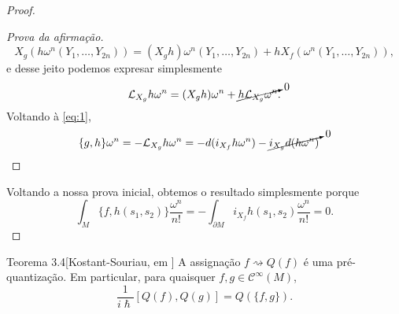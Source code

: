 \begin{proof}
\begin{proof}[Prova da afirmação]
\[X_g\left( h \omega^n\left( Y_1,\ldots,Y_{2n} \right)  \right)=(X_gh)\omega^n(Y_1,\ldots,Y_{2n})+hX_f\left( \omega^n(Y_1,\ldots,Y_{2n}) \right), \]
e desse jeito podemos expresar simplesmente
\[\mathcal{L}_{X_g}h\omega^n=(X_gh)\omega^n+\cancelto{0}{h\mathcal{L}_{X_g}\omega^n}.\]
Voltando à \cref{eq:1},
\begin{align*}
\{g,h\}\omega^n&=-\mathcal{L}_{X_g}h \omega^n=-d(i_{X_f}h\omega^n)-\cancelto{0}{i_{X_g}d(h \omega^n)}
\end{align*}
\end{proof}
Voltando a nossa prova inicial, obtemos o resultado simplesmente porque
\[\int_{M}\{f,h(s_1,s_2)\}\frac{\omega^n}{n!}=-\int_{\partial M}i_{X_f}h(s_1,s_2)\frac{\omega^n}{n!}=0.\]
\end{proof}

\begin{thing5}{Teorema 3.4}[Kostant-Souriau, em \cite{wang}]\leavevmode
A assignação $f \rightsquigarrow Q(f)$ é uma pré-quantização. Em particular, para quaisquer $f,g \in \mathcal{C}^\infty(M)$,
\begin{equation}\label{eq:prequant}\frac{1}{i\hslash}[Q(f),Q(g)]=Q(\{f,g\}).
\end{equation}
\end{thing5}

